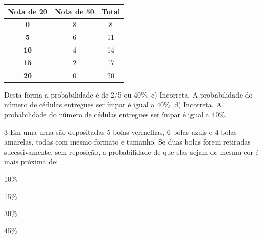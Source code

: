\begin{escolha}
\begin{escolha}
\begin{escolha}
\begin{escolha}
{\begin{boxmedio}
\begin{boxpeq}
\begin{q°}
\begin{boxmedio}
\begin{boxpeq}
\begin{boxpeq}
\begin{boxmedio}
\begin{boxmedio}
\begin{boxmedio}
\begin{largebox}
\begin{boxmedio}
{\begin{enumerate}
\begin{boxpeq}
{\begin{boxpeq}
\begin{boxpeq}
\begin{boxmedio}
\begin{boxpeq}
\begin{boxpeq}
\begin{boxpeq}
{\begin{table}[]
\begin{tabular}{|c|c|c|}
\hline
\textbf{Nota de 20} & \textbf{Nota de 50} & \textbf{Total} \\ \hline
\textbf{0} & 8 & 8 \\ \hline
\textbf{5} & 6 & 11 \\ \hline
\textbf{10} & 4 & 14 \\ \hline
\textbf{15} & 2 & 17 \\ \hline
\textbf{20} & 0 & 20 \\ \hline
\end{tabular}
\end{table}

Desta forma a probabilidade é de 2/5 ou 40\%.
c) Incorreta. A probabilidade do número de cédulas entregues ser ímpar é igual a 40\%. 
d) Incorreta. A probabilidade do número de cédulas entregues ser ímpar é igual a 40\%.}

\num{3} Em uma urna são depositadas 5 bolas vermelhas, 6 bolas azuis e 4 bolas
amarelas, todas com mesmo formato e tamanho. Se duas bolas forem
retiradas sucessivamente, sem reposição, a probabilidade de que elas
sejam de mesma cor é mais próxima de:

\begin{escolha}

  \item 10\%

  \item 15\%

  \item 30\%

  \item 45\%

\end{escolha}

\end{boxpeq}
\end{boxpeq}
\end{boxpeq}
\end{boxmedio}
\end{boxpeq}
\end{boxpeq}}
\end{boxpeq}
\end{enumerate}}
\end{boxmedio}
\end{largebox}
\end{boxmedio}
\end{boxmedio}
\end{boxmedio}
\end{boxpeq}
\end{boxpeq}
\end{boxmedio}
\end{q°}
\end{boxpeq}
\end{boxmedio}}
\end{escolha}
\end{escolha}
\end{escolha}
\end{escolha}
